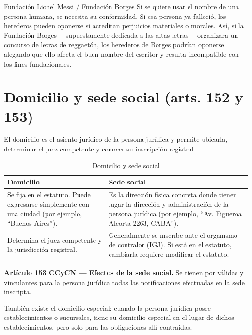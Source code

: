\documentclass[12pt,oneside]{book}
\begin{document}
\begin{example}{Fundación Lionel Messi / Fundación Borges}
Si se quiere usar el nombre de una persona humana, se necesita su conformidad. Si esa persona ya falleció, los herederos pueden oponerse si acreditan perjuicios materiales o morales. Así, si la Fundación Borges —supuestamente dedicada a las altas letras— organizara un concurso de letras de reggaetón, los herederos de Borges podrían oponerse alegando que ello afecta el buen nombre del escritor y resulta incompatible con los fines fundacionales.
\end{example}

\section{Domicilio y sede social (arts. 152 y 153)}

El domicilio es el asiento jurídico de la persona jurídica y permite ubicarla, determinar el juez competente y conocer su inscripción registral.

\begin{table}[H]
\centering
\caption{Domicilio y sede social}
\begin{tabularx}{\textwidth}{>{\raggedright\arraybackslash}X >{\raggedright\arraybackslash}X}
\toprule
\textbf{Domicilio} & \textbf{Sede social} \\
\midrule
Se fija en el estatuto. Puede expresarse simplemente con una ciudad (por ejemplo, ``Buenos Aires''). & Es la dirección física concreta donde tienen lugar la dirección y administración de la persona jurídica (por ejemplo, ``Av. Figueroa Alcorta 2263, CABA''). \\
Determina el juez competente y la jurisdicción registral. & Generalmente se inscribe ante el organismo de contralor (IGJ). Si está en el estatuto, cambiarla requiere modificar el estatuto. \\
\bottomrule
\end{tabularx}
\end{table}

\begin{important}
\textbf{Artículo 153 CCyCN --- Efectos de la sede social.} Se tienen por válidas y vinculantes para la persona jurídica todas las notificaciones efectuadas en la sede inscripta.
\end{important}

También existe el domicilio especial: cuando la persona jurídica posee establecimientos o sucursales, tiene su domicilio especial en el lugar de dichos establecimientos, pero solo para las obligaciones allí contraídas.
\end{document}
